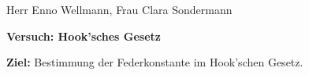 


Herr Enno Wellmann, Frau Clara Sondermann

\textbf{Versuch: Hook'sches Gesetz}

\textbf{Ziel:}
Bestimmung der Federkonstante im Hook'schen Gesetz.
